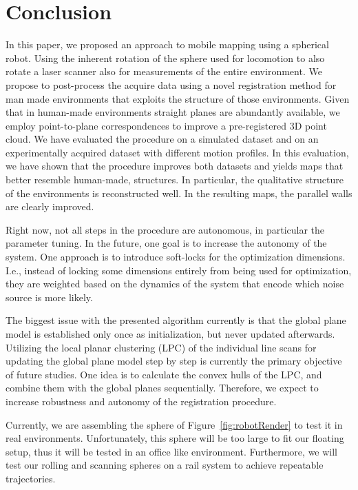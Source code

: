 \section{Conclusion}

In this paper, we proposed an approach to mobile mapping using a spherical robot. 
Using the inherent rotation of the sphere used for locomotion to also rotate a laser scanner also for measurements of the entire environment.
We propose to post-process the acquire data using a novel registration method for man made environments that exploits the structure of those environments. 
Given that in human-made environments straight planes are abundantly available, we employ point-to-plane correspondences to improve a pre-registered 3D point cloud. 
We have evaluated the procedure on a simulated dataset and on an experimentally acquired dataset with different motion profiles. 
In this evaluation, we have shown that the procedure improves both datasets and yields maps that better resemble human-made, structures. 
In particular, the qualitative structure of the environments is reconstructed well. 
In the resulting maps, the parallel walls are clearly improved.

%
Right now, not all steps in the procedure are autonomous, in particular the parameter tuning. 
In the future, one goal is to increase the autonomy of the system.
One approach is to introduce soft-locks for the optimization dimensions.
I.e., instead of locking some dimensions entirely from being used for optimization, they are weighted based on the dynamics of the system that encode which noise source is more likely.  

%
The biggest issue with the presented algorithm currently is that the global plane model is established only once as initialization, but never updated afterwards.
Utilizing the local planar clustering (LPC) of the individual line scans for updating the global plane model step by step is currently the primary objective of future studies.
One idea is to calculate the convex hulls of the LPC, and combine them with the global planes sequentially.
Therefore, we expect to increase robustness and autonomy of the registration procedure.

%
Currently, we are assembling the sphere of Figure~\ref{fig:robotRender} to test it in real environments.
Unfortunately, this sphere will be too large to fit our floating setup, thus it will be tested in an office like environment.
Furthermore, we will test our rolling and scanning spheres on a rail system to achieve repeatable trajectories. 
